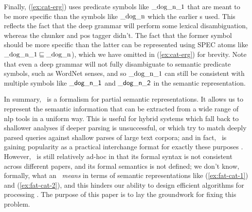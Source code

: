 Finally, (\ref{ex:cat-erg}) uses predicate symbols like
$\mathrm{\_dog\_n\_1}$ that are meant to be more specific than the
symbols like $\mathrm{\_dog\_n}$ which the earlier \rmrs s used.
This reflects the fact that the deep grammar will perform some lexical
disambiguation, whereas the chunker and {\sc pos} tagger didn't.  The fact
that the former symbol should be more specific than the latter can be
represented using SPEC atoms like $\mathrm{\_dog\_n\_1}\sqsubseteq
\mathrm{\_dog\_n}$), which we have omitted in (\ref{ex:cat-erg}) for
brevity.  Note that even a deep grammar will not fully disambiguate to
semantic predicate symbols, such as WordNet senses, and so
$\mathrm{\_dog\_n\_1}$ can still be consistent with multiple symbols
like $\mathsf{\_dog\_n\_1}$ and $\mathsf{\_dog\_n\_2}$ in the semantic
representation.

In summary, \rmrs\ is a formalism for partial semantic
representations.  It allows us to represent the semantic information
that can be extracted from a wide range of {\sc nlp} tools in a uniform way.
This is useful for hybrid systems which fall back to shallower
analyses if deeper parsing is unsuccessful, or which try to match
deeply parsed queries against shallow parses of large text corpora;
and in fact, \rmrs\ is gaining popularity as a practical interchange
format for exactly these purposes \cite{copestake:2003,frank:2004}.
However, \rmrs\ is still relatively ad-hoc in that its formal syntax
is not consistent across different papers, and its formal semantics is
not defined; we don't know, formally, what an \rmrs\ \emph{means} in
terms of semantic representations like (\ref{ex:fat-cat-1}) and
(\ref{ex:fat-cat-2}), and this hinders our ability to design efficient
algorithms for processing \rmrs. The purpose of this paper is to lay
the groundwork for fixing this problem.

